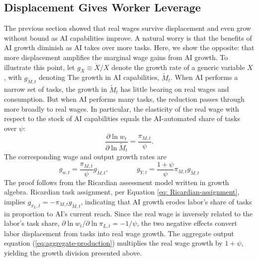 \documentclass[11pt]{article}
\begin{document}
\subsection{Displacement Gives Worker Leverage}\label{sec:leverage}

The previous section showed that real wages survive displacement and
even grow without bound as AI capabilities improve. A natural worry
is that the benefits of AI growth diminish as AI takes over more tasks.
Here, we show the opposite: that more displacement amplifies the marginal
wage gains from AI growth. To illustrate this point, let $g_{X}\equiv\dot{X}/X$
denote the growth rate of a generic variable $X$, with $g_{\widetilde{M},t}$
denoting The growth in AI capabilities, $\widetilde{M}_{t}$. When
AI performs a narrow set of tasks, the growth in $\widetilde{M}_{t}$
has little bearing on real wages and consumption. But when AI performs
many tasks, the reduction passes through more broadly to real wages.
In particular, the elasticity of the real wage with respect to the
stock of AI capabilities equals the AI-automated share of tasks over
$\psi$:
\begin{equation}
\frac{\partial\ln w_{t}}{\partial\ln\widetilde{M}_{t}}=\frac{\pi_{M,t}}{\psi}.\label{eq:leverage-elasticity}
\end{equation}
The corresponding wage and output growth rates are
\begin{equation}
g_{w,t}=\frac{\pi_{M,t}}{\psi}g_{\widetilde{M},t},\qquad\qquad g_{Y,t}=\frac{1+\psi}{\psi}\pi_{M,t}g_{\widetilde{M},t}\label{eq:leverage-wage-growth}

\end{equation}
The proof follows from the Ricardian assessment model written in growth
algebra. Ricardian task assignment, per Equation \eqref{eq: Ricardian-assignment},
implies $g_{\pi_{L},t}=-\pi_{M,t}g_{\widetilde{M},t}$, indicating
that AI growth erodes labor's share of tasks in proportion to AI's
current reach. Since the real wage is inversely related to the labor's
task share, $\partial\ln w_{t}/\partial\ln\pi_{L,t}=-1/\psi$, the
two negative effects convert labor displacement from tasks into real
wage growth. The aggregate output equation (\eqref{eq:aggregate-production})
multiplies the real wage growth by $1+\psi$, yielding the growth
division presented above.
\end{document}
